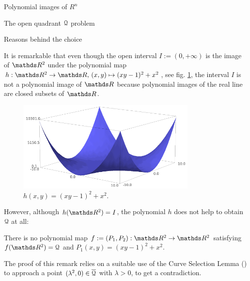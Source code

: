 \documentclass[11pt, a4paper, english, twoside, notitlepage, openright]{report}
\begin{document}
\begin{chapter}{Polynomial images of $R^n$}
\begin{section}{The open quadrant $\mathcal{Q}$ problem}
\begin{subsection}{Reasons behind the choice}\label{quadReasons}
		
It is remarkable that even though the open interval $I:=(0,+\infty)$ is the image of $\R^2$ under the polynomial map $h:\R^2\to\R,\, (x,y)\mapsto (xy-1)^2+x^2$, see fig. \ref{fig:h(x,y)}, the interval $I$ is not a polynomial image of $\R$ because polynomial images of the real line are closed subsets of $\R$.
\begin{figure}[h]
\begin{center}
\includegraphics[width=0.8\textwidth]{plots/ch1_03_f(x,y).png}
\caption{$h(x,y)=(xy-1)^2+x^2$.\label{fig:h(x,y)}}
\end{center}
\end{figure}
		
However, although $h(\R^2)=I$, the polynomial $h$ does not help to obtain $\mathcal{Q}$ at all:
\begin{remark}
There is no polynomial map $f:=(P_1, P_2):\R^2\to\R^2$ satisfying $f(\R^2)=\Qu$ and $P_1(x,y)=(xy-1)^2+x^2$.
\end{remark}
The proof of this remark relies on a suitable use of the Curve Selection Lemma (\cite[VIII.2.6]{abr}) to approach a point $(\lambda^2,0)\in\overline{\mathcal{Q}}$ with $\lambda>0$, to get a contradiction.
		

\end{subsection}
\end{section}
\end{chapter}
\end{document}
